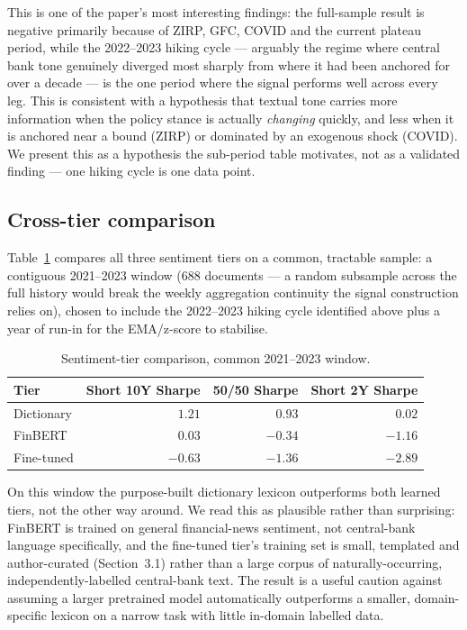 \documentclass[11pt]{article}
\begin{document}
This is one of the paper's most interesting findings: the full-sample result
is negative primarily because of ZIRP, GFC, COVID and the current plateau
period, while the 2022--2023 hiking cycle --- arguably the regime where
central bank tone genuinely diverged most sharply from where it had been
anchored for over a decade --- is the one period where the signal
performs well across every leg. This is consistent with a hypothesis that
textual tone carries more information when the policy stance is actually
\emph{changing} quickly, and less when it is anchored near a bound (ZIRP)
or dominated by an exogenous shock (COVID). We present this as a
hypothesis the sub-period table motivates, not as a validated finding ---
one hiking cycle is one data point.

\subsection{Cross-tier comparison}
\label{sec:tiers}

Table~\ref{tab:tiers} compares all three sentiment tiers on a common,
tractable sample: a contiguous 2021--2023 window (688 documents --- a
random subsample across the full history would break the weekly
aggregation continuity the signal construction relies on), chosen to
include the 2022--2023 hiking cycle identified above plus a year of
run-in for the EMA/z-score to stabilise.

\begin{table}[H]
\centering
\begin{tabular}{lrrr}
\toprule
Tier & Short 10Y Sharpe & 50/50 Sharpe & Short 2Y Sharpe \\
\midrule
Dictionary  & $\mathbf{1.21}$  & $\mathbf{0.93}$  & $0.02$  \\
FinBERT     & $0.03$  & $-0.34$ & $-1.16$ \\
Fine-tuned  & $-0.63$ & $-1.36$ & $-2.89$ \\
\bottomrule
\end{tabular}
\caption{Sentiment-tier comparison, common 2021--2023 window.}
\label{tab:tiers}
\end{table}

On this window the purpose-built dictionary lexicon outperforms both
learned tiers, not the other way around. We read this as plausible rather
than surprising: FinBERT is trained on general financial-news sentiment,
not central-bank language specifically, and the fine-tuned tier's training
set is small, templated and author-curated (Section~3.1) rather than a
large corpus of naturally-occurring, independently-labelled central-bank
text. The result is a useful caution against assuming a larger pretrained
model automatically outperforms a smaller, domain-specific lexicon on a
narrow task with little in-domain labelled data.
\end{document}
